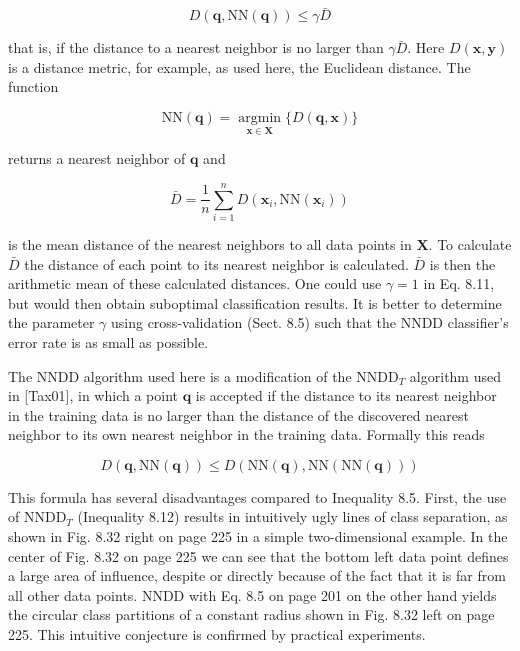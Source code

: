 \documentclass[10pt]{article}
\begin{document}
\begin{equation*}
D(\boldsymbol{q}, \mathrm{NN}(\boldsymbol{q})) \leq \gamma \bar{D} \tag{8.11}
\end{equation*}


that is, if the distance to a nearest neighbor is no larger than $\gamma \bar{D}$. Here $D(\boldsymbol{x}, \boldsymbol{y})$ is a distance metric, for example, as used here, the Euclidean distance. The function

$$
\mathrm{NN}(\boldsymbol{q})=\underset{\boldsymbol{x} \in \boldsymbol{X}}{\operatorname{argmin}}\{D(\boldsymbol{q}, \boldsymbol{x})\}
$$

returns a nearest neighbor of $\boldsymbol{q}$ and

$$
\bar{D}=\frac{1}{n} \sum_{i=1}^{n} D\left(\boldsymbol{x}_{i}, \mathrm{NN}\left(\boldsymbol{x}_{i}\right)\right)
$$

is the mean distance of the nearest neighbors to all data points in $\boldsymbol{X}$. To calculate $\bar{D}$ the distance of each point to its nearest neighbor is calculated. $\bar{D}$ is then the arithmetic mean of these calculated distances. One could use $\gamma=1$ in Eq. 8.11, but would then obtain suboptimal classification results. It is better to determine the parameter $\gamma$ using cross-validation (Sect. 8.5) such that the NNDD classifier's error rate is as small as possible.

The NNDD algorithm used here is a modification of the $\mathrm{NNDD}_{T}$ algorithm used in [Tax01], in which a point $\boldsymbol{q}$ is accepted 
if the distance to its nearest neighbor in the training data is no larger than the distance of the discovered nearest neighbor to its own nearest neighbor in the training data. Formally this reads


\begin{equation*}
D(\boldsymbol{q}, \mathrm{NN}(\boldsymbol{q})) \leq D(\mathrm{NN}(\boldsymbol{q}), \mathrm{NN}(\mathrm{NN}(\boldsymbol{q}))) \tag{8.12}
\end{equation*}


This formula has several disadvantages compared to Inequality 8.5. First, the use of $\mathrm{NNDD}_{T}$ (Inequality 8.12) results in intuitively ugly lines of class separation, as shown in Fig. 8.32 right on page 225 in a simple two-dimensional example. In the center of Fig. 8.32 on page 225 we can see that the bottom left data point defines a large area of influence, despite or directly because of the fact that it is far from all other data points. NNDD with Eq. 8.5 on page 201 on the other hand yields the circular class partitions of a constant radius shown in Fig. 8.32 left on page 225. This intuitive conjecture is confirmed by practical experiments.
\end{document}
